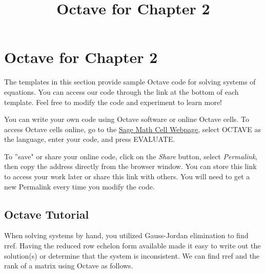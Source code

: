 \documentclass{ximera}
\title{Octave for Chapter 2} \license{CC BY-NC-SA 4.0}
\begin{document}
 
\begin{abstract}
\end{abstract}
\maketitle
 
\section*{Octave for Chapter 2}
 
The templates in this section provide sample Octave code for solving systems of equations. You can access our code through the link at the bottom of each template.  Feel free to modify the code and experiment to learn more! 
 
You can write your own code using Octave software or online Octave cells.  To access Octave cells online, go to the \href{https://sagecell.sagemath.org/}{Sage Math Cell Webpage}, select OCTAVE as the language, enter your code, and press EVALUATE. 
 
To ''save" or share your online code, click on the \emph{Share} button, select \emph{Permalink}, then copy the address directly from the browser window.  You can store this link to access your work later or share this link with others.  You will need to get a new Permalink every time you modify the code.
 
 
\subsection*{Octave Tutorial}
 
When solving systems by hand, you utilized Gauss-Jordan elimination to find rref.  Having the reduced row echelon form available made it easy to write out the solution(s) or determine that the system is inconsistent.  We can find rref and the rank of a matrix using Octave as follows.
 
\end{document}
